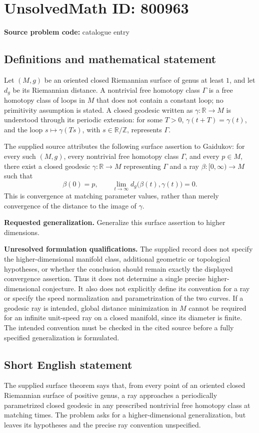 \documentclass[11pt]{article}
\newcommand{\Z}{\mathbb{Z}}
\newcommand{\R}{\mathbb{R}}
\begin{document}
\section*{UnsolvedMath ID: 800963}
\textbf{Source problem code:} catalogue entry
\subsection{Definitions and mathematical statement}
Let \((M,g)\) be an oriented closed Riemannian surface of genus at least \(1\), and let \(d_g\) be its Riemannian distance. A nontrivial free homotopy class \(\Gamma\) is a free homotopy class of loops in \(M\) that does not contain a constant loop; no primitivity assumption is stated. A closed geodesic written as \(\gamma:\R\to M\) is understood through its periodic extension: for some \(T>0\), \(\gamma(t+T)=\gamma(t)\), and the loop \(s\mapsto\gamma(Ts)\), with \(s\in\R/\Z\), represents \(\Gamma\).

The supplied source attributes the following surface assertion to Gaidukov: for every such \((M,g)\), every nontrivial free homotopy class \(\Gamma\), and every \(p\in M\), there exist a closed geodesic \(\gamma:\R\to M\) representing \(\Gamma\) and a ray \(\beta:[0,\infty)\to M\) such that
\[
\beta(0)=p,
\qquad
\lim_{t\to\infty}d_g\bigl(\beta(t),\gamma(t)\bigr)=0.
\]
This is convergence at matching parameter values, rather than merely convergence of the distance to the image of \(\gamma\).

\textbf{Requested generalization.} Generalize this surface assertion to higher dimensions.

\textbf{Unresolved formulation qualifications.} The supplied record does not specify the higher-dimensional manifold class, additional geometric or topological hypotheses, or whether the conclusion should remain exactly the displayed convergence assertion. Thus it does not determine a single precise higher-dimensional conjecture. It also does not explicitly define its convention for a ray or specify the speed normalization and parametrization of the two curves. If a geodesic ray is intended, global distance minimization in \(M\) cannot be required for an infinite unit-speed ray on a closed manifold, since its diameter is finite. The intended convention must be checked in the cited source before a fully specified generalization is formulated.
\subsection{Short English statement}
The supplied surface theorem says that, from every point of an oriented closed Riemannian surface of positive genus, a ray approaches a periodically parametrized closed geodesic in any prescribed nontrivial free homotopy class at matching times. The problem asks for a higher-dimensional generalization, but leaves its hypotheses and the precise ray convention unspecified.
\end{document}
